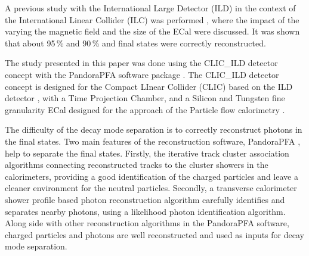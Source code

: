 \documentclass[a4paper,11pt]{article}
\newcommand{\decayPion}{\PGpm\PGnGt}
\newcommand{\decayRho}{\PGrP{\PGpm\PGpz}\PGnGt}
\newcommand{\decayAiPhoton}{\PaDoP{\PGpm\PGpz\PGpz}\PGnGt}
\begin{document}

A previous study with the International Large Detector (ILD) in the context of the International Linear Collider (ILC) was performed \cite{Tran2016}, where the impact of the varying the magnetic field and the size of the ECal were discussed. It was shown that about 95\,\% \decayPion and 90\,\% \decayRho and \decayAiPhoton final states were correctly reconstructed.





The study presented in this paper was done using the CLIC\_ILD detector concept with the PandoraPFA software package . The CLIC\_ILD detector concept \cite{Linssen:2012hp} is designed for the Compact LInear Collider (CLIC) based on the ILD detector \cite{Abe:2010aa}, with a Time Projection Chamber, and a Silicon and Tungsten fine granularity ECal designed for the approach of the Particle flow calorimetry \cite{Marshall:2012ry}. 



The difficulty of the \PGt decay mode separation is to correctly reconstruct photons in the final states. Two main features of the reconstruction software, PandoraPFA \cite{Marshall:2015rfa}, help to separate the final states. Firstly, the iterative track cluster association algorithms connecting reconstructed tracks to the cluster showers in the calorimeters, providing a good identification of the charged particles and leave a cleaner environment for the neutral particles. Secondly, a transverse calorimeter shower profile based photon reconstruction algorithm carefully identifies and separates nearby photons, using a likelihood photon identification algorithm. Along side with other reconstruction algorithms in the PandoraPFA software, charged particles and photons are well reconstructed and used as inputs for \PGt decay mode separation.
\end{document}
